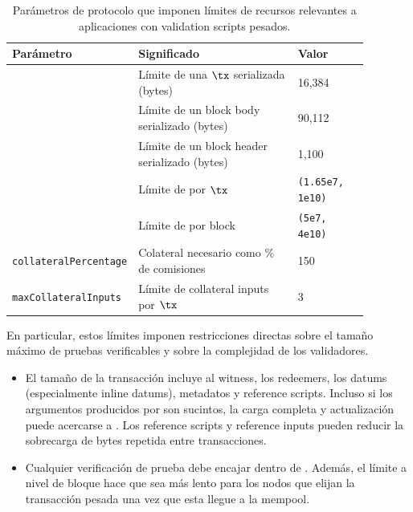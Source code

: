 \begin{table}[t]
	\centering
	\footnotesize
	\begin{tabular}{p{0.22\linewidth} p{0.46\linewidth} p{0.20\linewidth}}
		\hline
		\textbf{Parámetro} & \textbf{Significado} & \textbf{Valor} \\ 
		\hline
		\maxTxSize & Límite de una $\tx$ serializada (bytes) & 16,384 \\
		\maxBlockBodySize & Límite de un block body serializado (bytes) & 90,112 \\
		\maxBlockHeaderSize & Límite de un block header serializado (bytes) & 1,100 \\
		\maxTxExUnits & Límite de \ExUnits por $\tx$ & \texttt{(1.65e7, 1e10)} \\
		\maxBlockExUnits & Límite de \ExUnits por block & \texttt{(5e7, 4e10)} \\
		\texttt{collateral}\newline\texttt{Percentage} & Colateral necesario como \% de comisiones & 150 \\
		\texttt{maxCollateral}\newline\texttt{Inputs} & Límite de collateral inputs por $\tx$ & 3 \\
		\hline
	\end{tabular}
	
	\caption{Parámetros de protocolo que imponen límites de recursos relevantes a aplicaciones con validation scripts pesados.}
	\label{tab:cardano-protocol-limits}
\end{table}

En particular, estos límites imponen restricciones directas sobre el tamaño máximo de pruebas verificables \Onchain y sobre la complejidad de los validadores.

\begin{itemize}[noitemsep]
	\item El tamaño de la transacción incluye al witness, los redeemers, los datums (especialmente inline datums), metadatos y reference scripts. Incluso si los argumentos producidos por \Groth son sucintos, la carga completa y actualización puede acercarse a \maxTxSize. Los reference scripts y reference inputs pueden reducir la sobrecarga de bytes repetida entre transacciones.
	\item Cualquier verificación de prueba \Onchain debe encajar dentro de \maxTxExUnits. Además, el límite a nivel de bloque \maxBlockExUnits hace que sea más lento para los nodos que elijan la transacción pesada una vez que esta llegue a la mempool.
\end{itemize}

